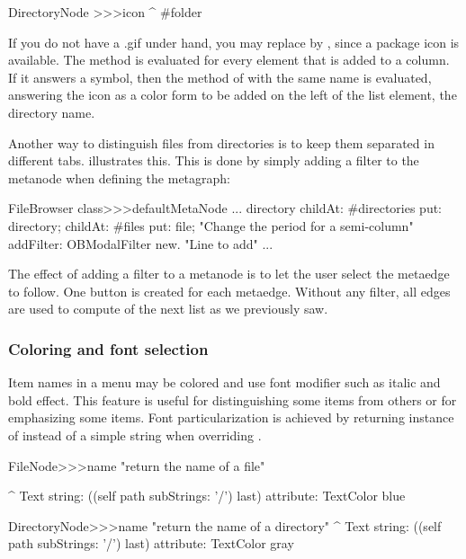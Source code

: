 \documentclass[a4paper,10pt,twoside]{book}
\begin{document}
\begin{code}{}
DirectoryNode >>>icon
	^ #folder  
\end{code}

If you do not have a .gif under hand, you may replace  by , since a package icon is available. The method  is evaluated for every element that is added to a column. If it answers a symbol, then the method of  with the same name is evaluated, answering the icon as a color form to be added on the left of the list element, \ie the directory name.

Another way to distinguish files from directories is to keep them separated in different tabs. 
 illustrates this. This is done by simply adding a filter to the  metanode when defining the metagraph:

\begin{code}{}
FileBrowser class>>>defaultMetaNode
    ...
    directory 
          childAt: #directories put: directory;
          childAt: #files put: file; 		   "Change the period for a semi-column"
	addFilter: OBModalFilter new.	 "Line to add"
    ...    
\end{code}

The effect of adding a filter to a metanode is to let the user select the metaedge to follow. One button is created for each metaedge. Without any filter, all edges are used to compute of the next list as we previously saw.

\subsubsection{Coloring and font selection}

Item names in a menu may be colored and use font modifier such as italic and bold effect. This feature is useful for distinguishing some items from others or for emphasizing some items. Font particularization is achieved by returning instance of  instead of a simple string when overriding .

\begin{code}{}
FileNode>>>name
	"return the name of a file"
	
	^ Text string: ((self path subStrings: '/') last) attribute: TextColor blue

DirectoryNode>>>name
	"return the name of a directory"
	^ Text string: ((self path subStrings: '/') last) attribute: TextColor gray
\end{code}
\end{document}
